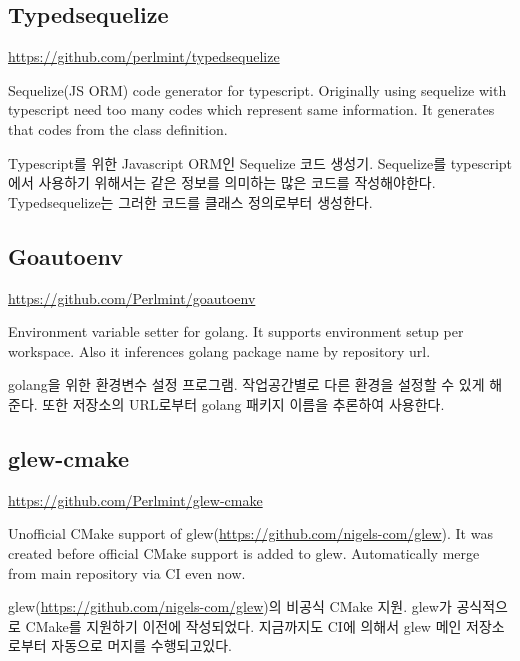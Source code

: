 \documentclass[11pt,a4paper]{article}
\begin{document}
\subsection{Typedsequelize}
\url{https://github.com/perlmint/typedsequelize}

\begin{xen}
  Sequelize(JS ORM) code generator for typescript. Originally using sequelize with typescript need too many codes which represent same information. It generates that codes from the class definition.
\end{xen}
\begin{xkr}
  Typescript를 위한 Javascript ORM인 Sequelize 코드 생성기. Sequelize를 typescript에서 사용하기 위해서는 같은 정보를 의미하는 많은 코드를 작성해야한다. Typedsequelize는 그러한 코드를 클래스 정의로부터 생성한다.
\end{xkr}

\subsection{Goautoenv}
\url{https://github.com/Perlmint/goautoenv}

\begin{xen}
  Environment variable setter for golang. It supports environment setup per workspace. Also it inferences golang package name by repository url.
\end{xen}
\begin{xkr}
  golang을 위한 환경변수 설정 프로그램. 작업공간별로 다른 환경을 설정할 수 있게 해준다. 또한 저장소의 URL로부터 golang 패키지 이름을 추론하여 사용한다.
\end{xkr}

\subsection{glew-cmake}
\url{https://github.com/Perlmint/glew-cmake}

\begin{xen}
  Unofficial CMake support of glew(\url{https://github.com/nigels-com/glew}). It was created before official CMake support is added to glew. Automatically merge from main repository via CI even now.
\end{xen}
\begin{xkr}
  glew(\url{https://github.com/nigels-com/glew})의 비공식 CMake 지원. glew가 공식적으로 CMake를 지원하기 이전에 작성되었다. 지금까지도 CI에 의해서 glew 메인 저장소로부터 자동으로 머지를 수행되고있다.
\end{xkr}
\end{document}
